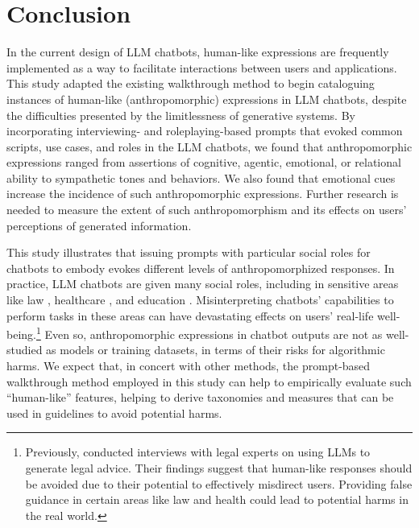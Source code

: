 \section{Conclusion}

In the current design of LLM chatbots, human-like expressions are frequently implemented as a way to facilitate interactions between users and applications. This study adapted the existing walkthrough method to begin cataloguing instances of human-like (anthropomorphic) expressions in LLM chatbots, despite the difficulties presented by the limitlessness of generative systems. By incorporating interviewing- and roleplaying-based prompts that evoked common scripts, use cases, and roles in the LLM chatbots, we found that anthropomorphic expressions ranged from assertions of cognitive, agentic, emotional, or relational ability to sympathetic tones and behaviors. We also found that emotional cues increase the incidence of such anthropomorphic expressions. Further research is needed to measure the extent of such anthropomorphism and its effects on users' perceptions of generated information. 

This study illustrates that issuing prompts with particular social roles for chatbots to embody evokes different levels of anthropomorphized responses. In practice, LLM chatbots are given many social roles, including in sensitive areas like law \citep{greco2023bringing}, healthcare \citep{thirunavukarasu2023large}, and education \citep{extance2023chatgpt}. Misinterpreting chatbots' capabilities to perform tasks in these areas can have devastating effects on users' real-life well-being.\footnote{Previously, \citet{cheong2024not} conducted interviews with legal experts on using LLMs to generate legal advice. Their findings suggest that human-like responses should be avoided due to their potential to effectively misdirect users. Providing false guidance in certain areas like law and health could lead to potential harms in the real world.} Even so, anthropomorphic expressions in chatbot outputs are not as well-studied as models or training datasets, in terms of their risks for algorithmic harms. We expect that, in concert with other methods, the prompt-based walkthrough method employed in this study can help to empirically evaluate such ``human-like'' features, helping to derive taxonomies and measures that can be used in guidelines to avoid potential harms.
